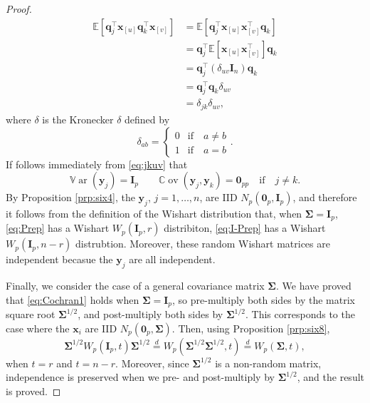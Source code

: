 \documentclass[]{book}
\theoremstyle{definition}
\theoremstyle{definition}
\theoremstyle{definition}
\theoremstyle{remark}
\begin{document}
\begin{proof}
\begin{align}
{\mathbb{E}}[\boldsymbol q_j^\top \boldsymbol x_{[u]} \boldsymbol q_k^\top \boldsymbol x_{[v]}] &={\mathbb{E}}[\boldsymbol q_j^\top \boldsymbol x_{[u]} \boldsymbol x_{[v]}^\top \boldsymbol q_k]\nonumber \\
&=\boldsymbol q_j^\top {\mathbb{E}}[\boldsymbol x_{[u]} \boldsymbol x_{[v]}^\top ]\boldsymbol q_k \nonumber\\
&=\boldsymbol q_j^\top \left (\delta_{uv}\mathbf I_n \right)\boldsymbol q_k \nonumber\\
&=\boldsymbol q_j^\top \boldsymbol q_k \delta_{uv}\nonumber\\
&=\delta_{jk}\delta_{uv},
\label{eq:jkuv}
\end{align}
where \(\delta\) is the Kronecker \(\delta\) defined by
\[
\delta_{ab}=\begin{cases} 0 &\text{if} \quad  a \neq b\\
1 &\text{if} \quad  a=b \end{cases}.
\]
If follows immediately from \eqref{eq:jkuv} that
\[
{\mathbb{V}\operatorname{ar}}(\boldsymbol y_j)=\mathbf I_p \qquad  {\mathbb{C}\operatorname{ov}}(\boldsymbol y_j , \boldsymbol y_k)={\mathbf 0}_{pp} \quad 
\text{if} \quad  j \neq k.
\]
By Proposition \ref{prp:six4}, the \(\boldsymbol y_j\), \(j=1,\ldots , n\), are IID \(N_p({\mathbf 0}_p , \mathbf I_p)\), and therefore it follows from the
definition of the Wishart distribution that, when \(\boldsymbol \Sigma=\mathbf I_p\), \eqref{eq:Prep} has a Wishart \(W_p(\mathbf I_p,r)\) distribiton, \eqref{eq:I-Prep} has a Wishart \(W_p(\mathbf I_p, n-r)\) distrubtion. Moreover, these random Wishart matrices are independent becasue the \(\boldsymbol y_j\) are all independent.

Finally, we consider the case of a general covariance matrix \(\boldsymbol \Sigma\). We have proved that \eqref{eq:Cochran1} holds
when \(\boldsymbol \Sigma=\mathbf I_p\), so pre-multiply both sides by the matrix square root \(\boldsymbol \Sigma^{1/2}\), and post-multiply both sides by \(\boldsymbol \Sigma^{1/2}\). This corresponds to the case where the \(\boldsymbol x_i\) are IID \(N_p({\mathbf 0}_p, \boldsymbol \Sigma)\). Then, using Proposition \ref{prp:six8},
\[
\boldsymbol \Sigma^{1/2} W_p(\mathbf I_p, t)\boldsymbol \Sigma^{1/2} \stackrel{d}{=} W_p(\boldsymbol \Sigma^{1/2} \boldsymbol \Sigma^{1/2}, t)
\stackrel{d}{=}W_p(\boldsymbol \Sigma,t),
\]
when \(t=r\) and \(t=n-r\). Moreover, since \(\boldsymbol \Sigma^{1/2}\) is a non-random matrix, independence is preserved
when we pre- and post-multiply by \(\boldsymbol \Sigma^{1/2}\), and the result is proved.
\end{proof}
\end{document}
